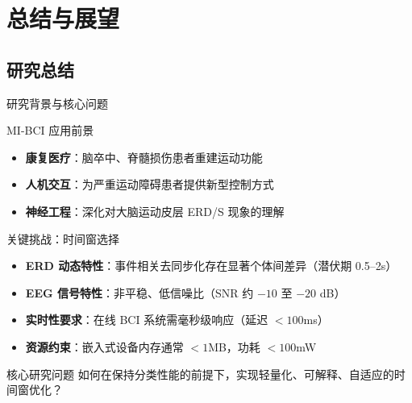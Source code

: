 
\section{总结与展望}

{\footnotesize

\subsection{研究总结}

\begin{frame}{研究背景与核心问题}
    \begin{block}{MI-BCI 应用前景}
        \begin{itemize}
            \item \textbf{康复医疗}：脑卒中、脊髓损伤患者重建运动功能
            \item \textbf{人机交互}：为严重运动障碍患者提供新型控制方式
            \item \textbf{神经工程}：深化对大脑运动皮层 ERD/S 现象的理解
        \end{itemize}
    \end{block}

    \begin{block}{关键挑战：时间窗选择}
        \begin{itemize}
            \item \textbf{ERD 动态特性}：事件相关去同步化存在显著个体间差异（潜伏期 0.5--2s）
            \item \textbf{EEG 信号特性}：非平稳、低信噪比（SNR 约 $-10$ 至 $-20$ dB）
            \item \textbf{实时性要求}：在线 BCI 系统需毫秒级响应（延迟 $< 100$ms）
            \item \textbf{资源约束}：嵌入式设备内存通常 $< 1$MB，功耗 $< 100$mW
        \end{itemize}
    \end{block}

    \begin{block}{核心研究问题}
        如何在保持分类性能的前提下，实现轻量化、可解释、自适应的时间窗优化？
    \end{block}
\end{frame}

}
